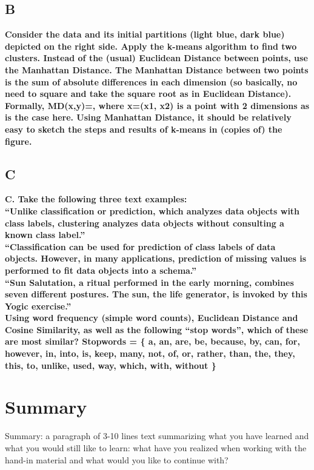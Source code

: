 \documentclass{article}
\theoremstyle{remark}
\begin{document}
\subsection{B}
\textbf{Consider the data and its initial partitions (light blue, dark blue) depicted on the right side. Apply the k-means algorithm to find two clusters. Instead of the (usual) Euclidean Distance between points, use the Manhattan Distance. The Manhattan Distance between two points is the sum of absolute differences in each dimension (so basically, no need to square and take the square root as in Euclidean Distance). Formally, MD(x,y)=, where x=(x1, x2) is a point with 2 dimensions as is the case here. Using Manhattan Distance, it should be relatively easy to sketch the steps and results of k-means in (copies of) the figure.}
\subsection{C}
\textbf{C. Take the following three text examples: \\
“Unlike classification or prediction, which analyzes data objects with class labels, clustering analyzes data objects without consulting a known class label.”\\
“Classification can be used for prediction of class labels of data objects. However, in many applications, prediction of missing values is performed to fit data objects into a schema.”\\
“Sun Salutation, a ritual performed in the early morning, combines seven different postures. The sun, the life generator, is invoked by this Yogic exercise.”\\
Using word frequency (simple word counts), Euclidean Distance and Cosine Similarity, as well as the following “stop words”, which of these are most similar? Stopwords = \{ a, an, are, be, because, by, can, for, however, in, into, is, keep, many, not,  of, or, rather, than, the, they, this, to, unlike, used, way, which, with, without \} }
\section{Summary}
Summary: a paragraph of 3-10 lines text summarizing what you have learned and what you would still like to learn: what have you realized when working with the hand-in material and what would you like to continue with?
\end{document}

